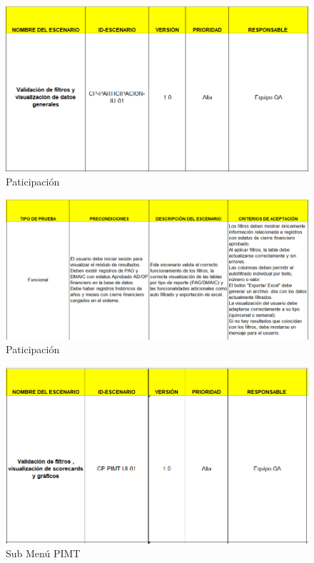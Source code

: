 \documentclass[12pt,letterpaper,spanish, xcolor=table]{report}
\numberwithin{figure}{subsection}
\begin{document}
	\begin{figure}[H]
		\centering
		\includegraphics[width=1.0\textwidth]
		{Imagenes/CenterPoint/ESubParticipacion.png}
		\caption{Paticipación}\label{a3}
	\end{figure}
	
	\begin{figure}[H]
		\centering
		\includegraphics[width=1.0\textwidth]
		{Imagenes/CenterPoint/ESubParicipacion2.png}
		\caption{Paticipación}\label{a3}
	\end{figure}
	
	\begin{figure}[H]
		\centering
		\includegraphics[width=1.0\textwidth]
		{Imagenes/CenterPoint/EPIMT.png}
		\caption{Sub Menú PIMT}\label{a3}
	\end{figure}
	
\end{document}
